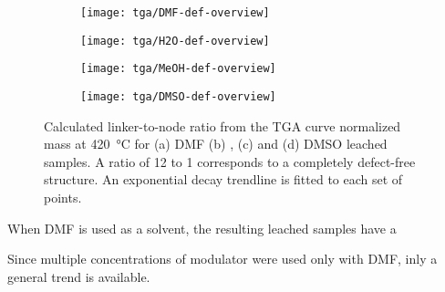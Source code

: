 \begin{figure}[htb]
    \centering

    \begin{subfigure}{0.45\linewidth}
        \texttt{[image: tga/DMF-def-overview]}%
        \label{def:fgr:tga-dmf-linkers}
    \end{subfigure}
    \begin{subfigure}{0.45\linewidth}
        \texttt{[image: tga/H2O-def-overview]}%
        \label{def:fgr:tga-h2o-linkers}
    \end{subfigure}

    
    \begin{subfigure}{0.45\linewidth}
        \texttt{[image: tga/MeOH-def-overview]}%
        \label{def:fgr:tga-meoh-linkers}
    \end{subfigure}
    \begin{subfigure}{0.45\linewidth}
        \texttt{[image: tga/DMSO-def-overview]}%
        \label{def:fgr:tga-dmso-linkers}
    \end{subfigure}

    \caption{Calculated linker-to-node ratio from the TGA curve 
    normalized mass at \SI{420}{\degreeCelsius} for (a) DMF 
    (b) , (c)  and (d) DMSO leached samples.
    A ratio of 12 to 1 corresponds to a completely defect-free
    structure. An exponential decay trendline is fitted to 
    each set of points.}%
    \label{def:fgr:tga-defects}
    
\end{figure}


When DMF is used as a solvent, the resulting leached samples 
have a 

Since multiple concentrations of modulator were used only with 
DMF, inly a general trend is available.